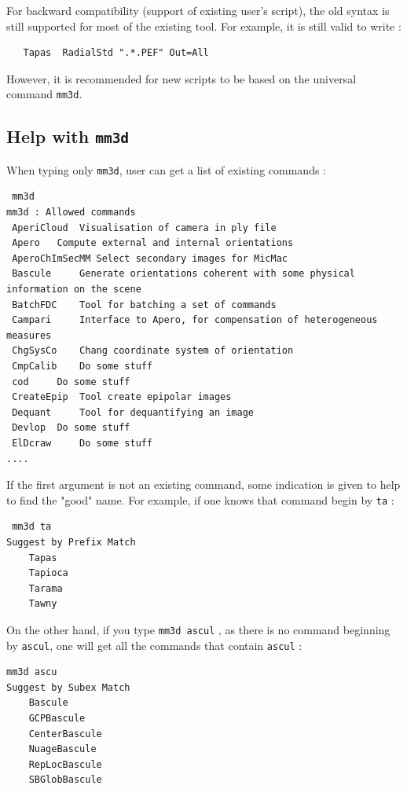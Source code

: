 For backward compatibility (support of existing user's script), the old syntax is still supported
for most of the existing tool. For example, it is still valid to write :

\begin{verbatim}
   Tapas  RadialStd ".*.PEF" Out=All
\end{verbatim}

However, it is recommended for new scripts to be based on the universal command {\tt mm3d}.



\subsection{Help with {\tt mm3d}}

When typing only {\tt mm3d}, user can get a list of existing commands :


\begin{verbatim}
 mm3d
mm3d : Allowed commands 
 AperiCloud	 Visualisation of camera in ply file
 Apero	 Compute external and internal orientations
 AperoChImSecMM	Select secondary images for MicMac 
 Bascule	 Generate orientations coherent with some physical information on the scene
 BatchFDC	 Tool for batching a set of commands
 Campari	 Interface to Apero, for compensation of heterogeneous measures
 ChgSysCo	 Chang coordinate system of orientation
 CmpCalib	 Do some stuff
 cod	 Do some stuff
 CreateEpip	 Tool create epipolar images
 Dequant	 Tool for dequantifying an image
 Devlop	 Do some stuff
 ElDcraw	 Do some stuff
....
\end{verbatim}

If the first argument is not an existing command, some indication is given to help to find 
the "good" name. For example, if one knows that command begin by {\tt ta}  :

\begin{verbatim}
 mm3d ta
Suggest by Prefix Match
    Tapas
    Tapioca
    Tarama
    Tawny
\end{verbatim}

On the other hand, if you type {\tt mm3d ascul} , as there is no command beginning by {\tt ascul},
one will get all the commands that contain {\tt ascul} :


\begin{verbatim}
mm3d ascu
Suggest by Subex Match
    Bascule
    GCPBascule
    CenterBascule
    NuageBascule
    RepLocBascule
    SBGlobBascule
\end{verbatim}


